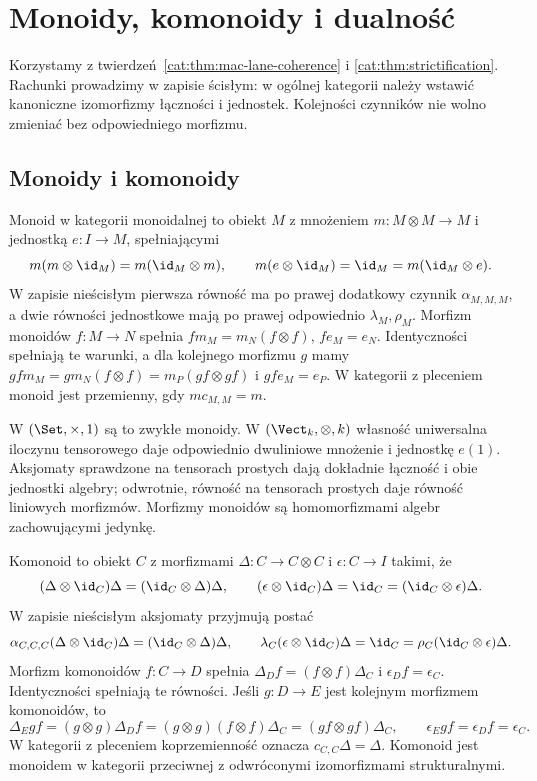 \section{Monoidy, komonoidy i dualność}\label{cat:sec:monoids-duality}
Korzystamy z twierdzeń~\ref{cat:thm:mac-lane-coherence} i \ref{cat:thm:strictification}. Rachunki prowadzimy w zapisie ścisłym: w ogólnej kategorii należy wstawić kanoniczne izomorfizmy łączności i jednostek. Kolejności czynników nie wolno zmieniać bez odpowiedniego morfizmu.

\subsection{Monoidy i komonoidy}
\begin{definicja}[Monoid]\label{cat:def:monoid-object}
Monoid w kategorii monoidalnej to obiekt $M$ z mnożeniem $m:M\otimes M\to M$ i jednostką $e:I\to M$, spełniającymi
\[
m(m\otimes\id_M)=m(\id_M\otimes m),\qquad
m(e\otimes\id_M)=\id_M=m(\id_M\otimes e).
\]
W zapisie nieścisłym pierwsza równość ma po prawej dodatkowy czynnik $\alpha_{M,M,M}$, a dwie równości jednostkowe mają po prawej odpowiednio $\lambda_M,\rho_M$. Morfizm monoidów $f:M\to N$ spełnia $fm_M=m_N(f\otimes f)$, $fe_M=e_N$. Identyczności spełniają te warunki, a dla kolejnego morfizmu $g$ mamy $gfm_M=gm_N(f\otimes f)=m_P(gf\otimes gf)$ i $gfe_M=e_P$. W kategorii z pleceniem monoid jest przemienny, gdy $mc_{M,M}=m$.
\end{definicja}
\begin{przyklad}\label{cat:ex:monoids-algebras}
W $(\Set,\times,1)$ są to zwykłe monoidy. W $(\Vect_k,\otimes,k)$ własność uniwersalna iloczynu tensorowego daje odpowiednio dwuliniowe mnożenie i jednostkę $e(1)$. Aksjomaty sprawdzone na tensorach prostych dają dokładnie łączność i obie jednostki algebry; odwrotnie, równość na tensorach prostych daje równość liniowych morfizmów. Morfizmy monoidów są homomorfizmami algebr zachowującymi jedynkę.
\end{przyklad}
\begin{definicja}[Komonoid]\label{cat:def:comonoid-object}
Komonoid to obiekt $C$ z morfizmami $\Delta:C\to C\otimes C$ i $\epsilon:C\to I$ takimi, że
\[
(\Delta\otimes\id_C)\Delta=(\id_C\otimes\Delta)\Delta,\qquad
(\epsilon\otimes\id_C)\Delta=\id_C=(\id_C\otimes\epsilon)\Delta.
\]
W zapisie nieścisłym aksjomaty przyjmują postać
\[
\alpha_{C,C,C}(\Delta\otimes\id_C)\Delta=(\id_C\otimes\Delta)\Delta,\qquad
\lambda_C(\epsilon\otimes\id_C)\Delta=\id_C=\rho_C(\id_C\otimes\epsilon)\Delta.
\]
Morfizm komonoidów $f:C\to D$ spełnia $\Delta_Df=(f\otimes f)\Delta_C$ i $\epsilon_Df=\epsilon_C$. Identyczności spełniają te równości. Jeśli $g:D\to E$ jest kolejnym morfizmem komonoidów, to
\[
\Delta_Egf=(g\otimes g)\Delta_Df=(g\otimes g)(f\otimes f)\Delta_C
=(gf\otimes gf)\Delta_C,\qquad \epsilon_Egf=\epsilon_Df=\epsilon_C.
\]
W kategorii z pleceniem koprzemienność oznacza $c_{C,C}\Delta=\Delta$. Komonoid jest monoidem w kategorii przeciwnej z odwróconymi izomorfizmami strukturalnymi.
\end{definicja}
